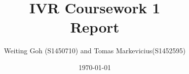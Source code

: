 \documentclass[12pt, a4paper]{article}
\title{IVR Coursework 1 \\ Report}
\author{Weiting Goh (S1450710) and Tomas Markevicius(S1452595)}
\date{\today}
\begin{document}
\maketitle

\newpage
\newpage
\newpage
\newpage

\nocite{*}


\end{document}
